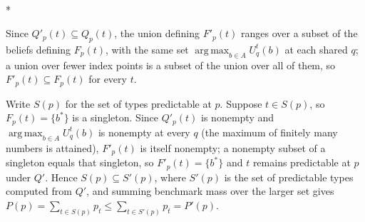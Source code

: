 \documentclass[12pt]{article}
\makeatletter
\theoremstyle{definition}
\renewenvironment{proof}[1][\proofname]{\par
  \pushQED{\qed}%
  \normalfont \topsep6\p@\@plus6\p@\relax
  \trivlist
  \item[\hskip\labelsep\itshape #1\@addpunct{.}]\mbox{}\\*
  \ignorespaces
}{%
  \popQED\endtrivlist\@endpefalse
}
\DeclareMathOperator*{\argmax}{arg\,max}
\makeatother
\begin{document}
\begin{proof}[Proof of Remark \ref{rem:mono}]
Since $Q'_p(t) \subseteq Q_p(t)$, the union defining $F'_p(t)$ ranges over a subset of the beliefs defining $F_p(t)$, with the same set $\argmax_{b \in A} U^t_q(b)$ at each shared $q$; a union over fewer index points is a subset of the union over all of them, so $F'_p(t) \subseteq F_p(t)$ for every $t$.

Write $S(p)$ for the set of types predictable at $p$. Suppose $t \in S(p)$, so $F_p(t) = \{b^*\}$ is a singleton. Since $Q'_p(t)$ is nonempty and $\argmax_{b \in A} U^t_q(b)$ is nonempty at every $q$ (the maximum of finitely many numbers is attained), $F'_p(t)$ is itself nonempty; a nonempty subset of a singleton equals that singleton, so $F'_p(t) = \{b^*\}$ and $t$ remains predictable at $p$ under $Q'$. Hence $S(p) \subseteq S'(p)$, where $S'(p)$ is the set of predictable types computed from $Q'$, and summing benchmark mass over the larger set gives $P(p) = \sum_{t \in S(p)} p_t \le \sum_{t \in S'(p)} p_t = P'(p)$.
\end{proof}
\end{document}
